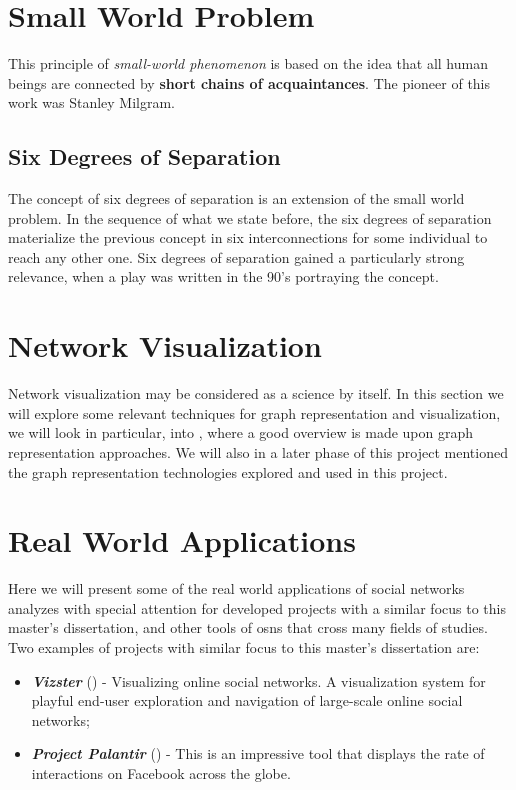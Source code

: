 \section{Small World Problem}
This principle of \textit{small-world phenomenon} is based on the idea that all human beings are connected by \textbf{short chains of acquaintances}. The pioneer of this work was Stanley Milgram.

\subsection*{Six Degrees of Separation}
The concept of six degrees of separation is an extension of the small world problem. In the sequence of what we state before, the six degrees of separation materialize the previous concept in six interconnections for some individual to reach any other one. Six degrees of separation gained a particularly strong relevance, when a play was written in the 90's portraying the concept.

\section{Network Visualization}
Network visualization may be considered as a science by itself. In this section we will explore some relevant techniques for graph representation and visualization, we will look in particular, into \cite{beck2014state}, where a good overview is made upon graph representation approaches. We will also in a later phase of this project mentioned the graph representation technologies explored and used in this project.




\section{Real World Applications}
Here we will present some of the real world applications of social networks analyzes with special attention for developed projects with a similar focus to this master's dissertation, and other tools of \glspl{osn} that cross many fields of studies. Two examples of projects with similar focus to this master's dissertation are:

\begin{itemize}
    \item \textit{\textbf{Vizster}} (\cite{heer2005vizster}) - Visualizing online social networks. A visualization system for playful end-user exploration and navigation of large-scale online social networks;
    \item \textit{\textbf{Project Palantir}} (\cite{project-palantir}) - This is an impressive tool that displays the rate of interactions on Facebook across the globe.
\end{itemize}
